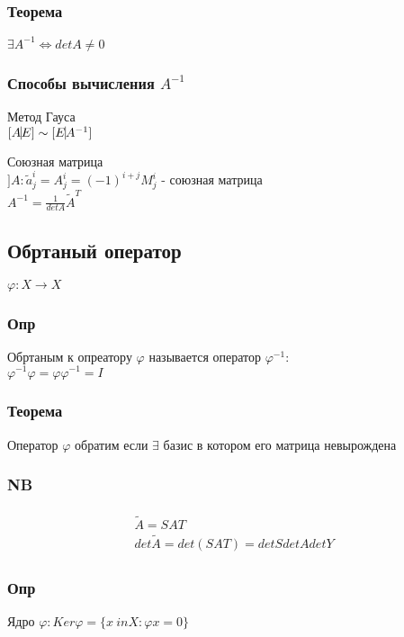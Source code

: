 \documentclass{article}
\begin{document}
\subsubsection{Теорема}
$\exists A^{-1} \Leftrightarrow det A \not = 0$

\subsubsection{Способы вычисления $A^{-1}$}
\begin{description}
\item Метод Гауса \\
  $[A \vline E] \sim [E \vline A^{-1}]$
\item Союзная матрица \\
  $] A : \tilde{a}^i_j = A^i_j = (-1)^{i+j}M^i_j$ - союзная матрица \\
  $A^{-1} = \frac{1}{det A}\tilde{A}^T$
\end{description}

\subsection{Обртаный оператор}
$\varphi : X \rightarrow X$
\subsubsection{Опр}
Обртаным к опреатору $\varphi$ называется оператор $\varphi^{-1}$: \\
$\varphi^{-1}\varphi = \varphi \varphi^{-1} = I$

\subsubsection{Теорема}
Оператор $\varphi$ обратим если $\exists$ базис в котором его матрица невырождена

\subsubsection{NB}
\begin{multline*}
\begin{align}
\tilde{A} = SAT \\
det \tilde{A} = det(SAT) = detS detA detY
\end{align}
\end{multline*}

\subsubsection{Опр}
Ядро $\varphi : Ker \varphi = \{x \ in X: \varphi x = 0\}$ 
\end{document}
